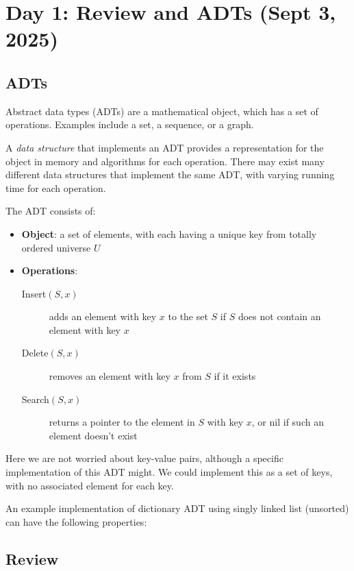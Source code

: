 \section{Day 1: Review and ADTs (Sept 3, 2025)}

\subsection{ADTs}

Abstract data types (ADTs) are a mathematical object, which has a set of operations. Examples include a set, a sequence, or a graph.

A \textit{data structure} that implements an ADT provides a representation for the object in memory and algorithms for each operation. There may exist many different data structures that implement the same ADT, with varying running time for each operation.

\begin{example}
    The ADT consists of:
    \begin{itemize}
    \item \textbf{Object}: a set of elements, with each having a unique key from totally ordered universe $U$
    \item \textbf{Operations}: 
    \begin{description}
    \item[Insert$(S, x)$] adds an element with key $x$ to the set $S$ if $S$ does not contain an element with key $x$
    \item[Delete$(S, x)$] removes an element with key $x$ from $S$ if it exists
    \item[Search$(S, x)$] returns a pointer to the element in $S$ with key $x$, or nil if such an element doesn't exist
    \end{description}
    \end{itemize}
\end{example}

Here we are not worried about key-value pairs, although a specific implementation of this ADT might. We could implement this as a set of keys, with no associated element for each key.

An example implementation of dictionary ADT using singly linked list (unsorted) can have the following properties:

    
\subsection{Review}

